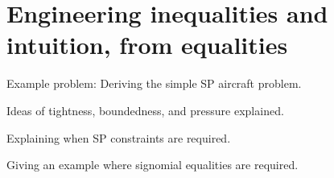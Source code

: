 \chapter{Engineering inequalities and intuition, from equalities}

Example problem: Deriving the simple SP aircraft problem. 

Ideas of tightness, boundedness, and pressure explained. 

Explaining when \gls{SP} constraints are required. 

Giving an example where signomial equalities are required. 